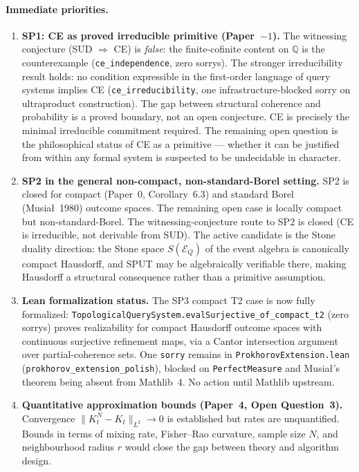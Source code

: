 \documentclass[11pt]{article}
\begin{document}
\paragraph{Immediate priorities.}

\begin{enumerate}

\item \textbf{SP1: CE as proved irreducible primitive (Paper~$-1$).}
The witnessing conjecture (SUD $\Rightarrow$ CE) is \emph{false}:
the finite-cofinite content on $\mathbb{Q}$ is the counterexample
(\texttt{ce\_independence}, zero sorrys).  The stronger irreducibility
result holds: no condition expressible in the first-order language
of query systems implies CE (\texttt{ce\_irreducibility}, one
infrastructure-blocked sorry on ultraproduct construction).
The gap between structural coherence and probability is a proved
boundary, not an open conjecture.  CE is precisely the minimal
irreducible commitment required.  The remaining open question is the
philosophical status of CE as a primitive --- whether it can be
justified from within any formal system is suspected to be undecidable
in character.

\item \textbf{SP2 in the general non-compact, non-standard-Borel setting.}
SP2 is closed for compact (Paper~0, Corollary~6.3) and standard Borel
(Musia\l~1980) outcome spaces.  The remaining open case is locally
compact but non-standard-Borel.  The witnessing-conjecture route to
SP2 is closed (CE is irreducible, not derivable from SUD).  The active
candidate is the Stone duality direction: the Stone space $S(\mathcal{E}_Q)$
of the event algebra is canonically compact Hausdorff, and SPUT may
be algebraically verifiable there, making Hausdorff a structural
consequence rather than a primitive assumption.

\item \textbf{Lean formalization status.}
The SP3 compact T2 case is now fully formalized:
\texttt{TopologicalQuerySystem.evalSurjective\_of\_compact\_t2} (zero sorrys)
proves realizability for compact Hausdorff outcome spaces with continuous
surjective refinement maps, via a Cantor intersection argument over
partial-coherence sets.  One \texttt{sorry} remains in
\texttt{ProkhorovExtension.lean} (\texttt{prokhorov\_extension\_polish}),
blocked on \texttt{PerfectMeasure} and Musia\l's theorem being absent
from Mathlib~4.  No action until Mathlib upstream.

\item \textbf{Quantitative approximation bounds (Paper~4, Open Question~3).}
Convergence $\|K_t^N - K_t\|_{L^2} \to 0$ is established but rates
are unquantified.  Bounds in terms of mixing rate, Fisher--Rao
curvature, sample size $N$, and neighbourhood radius $r$ would close
the gap between theory and algorithm design.

\end{enumerate}
\end{document}
